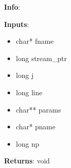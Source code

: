 \textbf{Info}:

\noindent \textbf{Inputs}:
\begin{itemize}
\item{char* fname}
\item{long stream\_ptr}
\item{long j}
\item{long line}
\item{char** params}
\item{char* pname}
\item{long np}
\end{itemize}

\noindent \textbf{Returns}: void
